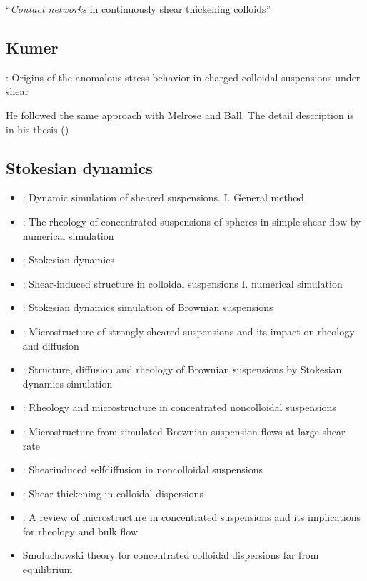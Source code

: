 \documentclass[12pt]{article}
\begin{document}
\citet{Melrose_2004}
``\emph{Contact networks} in continuously shear thickening colloids''


\subsection*{Kumer}

\citet{Kumar_2010}:
Origins of the anomalous stress behavior in charged colloidal suspensions under shear

He followed the same approach with Melrose and Ball.
The detail description is in his thesis (\citet{Kumar_2010a})


\subsection*{Stokesian dynamics}

\begin{itemize}
  \item 
  \citet{Bossis_1984}:
  Dynamic simulation of sheared suspensions. I. General method
  \item
  \citet{Brady_1985}:
  The rheology of concentrated suspensions of spheres in simple shear flow by numerical simulation
  \item 
  \citet{Brady_1988}:
  Stokesian dynamics
  \item
  \citet{Bossis_1988}:
  Shear-induced structure in colloidal suspensions I. numerical simulation

  \item \citet{Phung_1996}:
  Stokesian dynamics simulation of Brownian suspensions
  \item \citet{Brady_1997}: 
  Microstructure of strongly sheared suspensions and its impact on rheology and diffusion

  \item \citet{Foss_2000}:
  Structure, diffusion and rheology of {B}rownian suspensions by {S}tokesian dynamics simulation
  \item \citet{Sierou_2002}:
  Rheology and microstructure in concentrated noncolloidal suspensions
  \item \citet{Morris_2002}:
  Microstructure from simulated Brownian suspension flows at large shear rate
  \item \citet{Sierou_2004}:
  Shearinduced selfdiffusion in noncolloidal suspensions
  \item \citet{Wagner_2009}:
  Shear thickening in colloidal dispersions
  \item \citet{Morris_2009}:
  A review of microstructure in concentrated suspensions 
  and its implications for rheology and bulk flow
 \item \citet{Nazockdast_2012}
Smoluchowski theory for concentrated colloidal dispersions far from equilibrium
\end{itemize}
\end{document}
